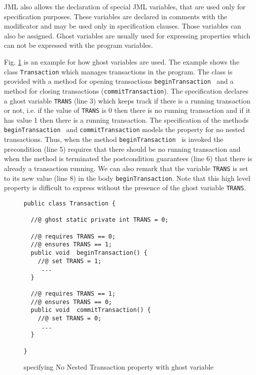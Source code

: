 \documentclass[a4paper]{llncs}
\begin{document}
 JML also allows the declaration of special JML variables, that are used only for specification purposes. 
 These variables are declared in comments with the  modificator and may be used only in specification clauses. Those variables 
 can also be assigned. Ghost variables are usually used  for expressing properties which can not be expressed with the program variables.

 Fig. \ref{bml:ghost} is an example for how ghost variables are used. The example shows the class \texttt{Transaction}
 which manages transactions in the program. The class is provided with a method for opening transactions \texttt{beginTransaction } and 
 a method for closing transactions (\texttt{commitTransaction}).  The specification declares a ghost variable
 \texttt{TRANS} (line 3) which keeps track if there is  a running transaction or not, i.e. if the value of  \texttt{TRANS} is 0
 then there is no running transaction and if it has value 1 then there is
 a running transaction. The specification of the methods \texttt{beginTransaction } and \texttt{commitTransaction}
 models the property for no nested transactions. Thus, when the method  \texttt{beginTransaction } is invoked the precondition (line 5) requires
 that there should be no running transaction and when the method is terminated the postcondition guarantees (line 6) that there is already a transaction running.
 We can also remark that the variable  \texttt{TRANS} is set to its new value (line 8) in the  body  \texttt{beginTransaction}.
 Note that this high level property is difficult to express without the presence
 of the ghost variable \texttt{TRANS}.  

\begin{figure}[ht!]
\begin{lstlisting}[frame=trbl] 
public class Transaction {

  //@ ghost static private int TRANS = 0; 
  
  //@ requires TRANS == 0;
  //@ ensures TRANS == 1;
  public void  beginTransaction() {
    //@ set TRANS = 1;
     ...
  }

  //@ requires TRANS == 1;
  //@ ensures TRANS == 0;
  public void  commitTransaction() {
    //@ set TRANS = 0; 
     ...
  }
  
}
\end{lstlisting}
\caption{\sc specifying No Nested Transaction property with ghost variable} 
\label{bml:ghost}
\end{figure}
\end{document}

